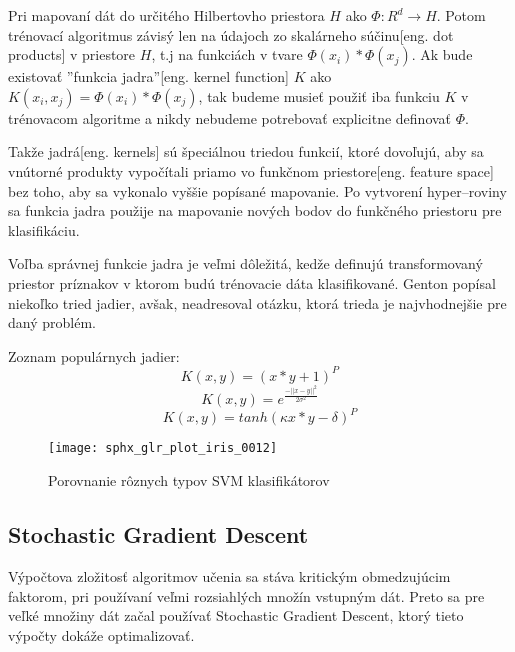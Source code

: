 Pri mapovaní dát do určitého Hilbertovho priestora \cite{prop:HilbertSpace} $H$ ako $\Phi:R^d \rightarrow H$.
Potom trénovací algoritmus závisý len na údajoch zo skalárneho súčinu[eng. dot products] v priestore $H$, t.j na funkciách v tvare $\Phi(x_i) * \Phi(x_j)$.
Ak bude existovať ''funkcia jadra''[eng. kernel function] $K$ ako $K(x_i, x_j) = \Phi(x_i)*\Phi(x_j)$, tak budeme musieť použiť iba funkciu $K$ v trénovacom algoritme
    a nikdy nebudeme potrebovať explicitne definovať $\Phi$\cite{prop:SupervisedMachineLearning}.

Takže jadrá[eng. kernels] sú špeciálnou triedou funkcií, ktoré dovoľujú, aby sa vnútorné produkty vypočítali priamo vo funkčnom priestore[eng. feature space] bez toho, aby sa vykonalo vyššie popísané mapovanie.
Po vytvorení hyper--roviny sa funkcia jadra použije na mapovanie nových bodov do funkčného priestoru pre klasifikáciu\cite{prop:SupervisedMachineLearning}.

Voľba správnej funkcie jadra je veľmi dôležitá, kedže definujú transformovaný priestor príznakov v ktorom budú trénovacie dáta klasifikované.
Genton \cite{prop:KernelClasses} popísal niekoľko tried jadier, avšak, neadresoval otázku, ktorá trieda je najvhodnejšie pre daný problém.

Zoznam populárnych jadier\cite{prop:SupervisedMachineLearning}:
\begin{equation}
    K(x, y) = (x*y+1)^P
\end{equation}
\begin{equation}
    K(x, y) = e^{\frac{-||x-y||^2}{2 \sigma^2}}
\end{equation}
\begin{equation}
    K(x, y) = tanh(\kappa x*y - \delta)^P
\end{equation}

\begin{figure}[H]
	\centering
	\texttt{[image: sphx\_glr\_plot\_iris\_0012]}
	\caption{Porovnanie rôznych typov SVM klasifikátorov\cite{odkaz:SVMImage}}
	\label{pic:SVMComparison}
\end{figure}


\subsection{Stochastic Gradient Descent}
Výpočtova zložitosť algoritmov učenia sa stáva kritickým obmedzujúcim faktorom, pri používaní veľmi rozsiahlých množín vstupným dát.
Preto sa pre veľké množiny dát začal používať Stochastic Gradient Descent\cite{prop:StochasticGradientDescent}, ktorý tieto výpočty dokáže optimalizovať.

